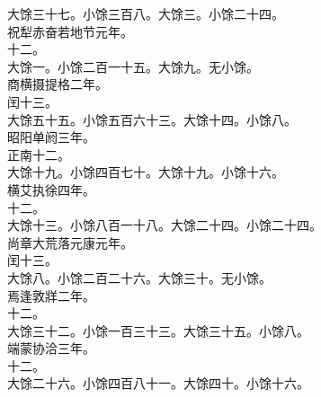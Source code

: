 \documentclass{zhvt-classic}
\begin{document}
\hspace*{2em}大馀三十七。小馀三百八。大馀三。小馀二十四。\\
\hspace*{2em}祝犁赤奋若地节元年。\\
\hspace*{2em}十二。\\
\hspace*{2em}大馀一。小馀二百一十五。大馀九。无小馀。\\
\hspace*{2em}商横摄提格二年。\\
\hspace*{2em}闰十三。\\
\hspace*{2em}大馀五十五。小馀五百六十三。大馀十四。小馀八。\\
\hspace*{2em}昭阳单阏三年。\\
\hspace*{2em}正南十二。\\
\hspace*{2em}大馀十九。小馀四百七十。大馀十九。小馀十六。\\
\hspace*{2em}横艾执徐四年。\\
\hspace*{2em}十二。\\
\hspace*{2em}大馀十三。小馀八百一十八。大馀二十四。小馀二十四。\\
\hspace*{2em}尚章大荒落元康元年。\\
\hspace*{2em}闰十三。\\
\hspace*{2em}大馀八。小馀二百二十六。大馀三十。无小馀。\\
\hspace*{2em}焉逢敦牂二年。\\
\hspace*{2em}十二。\\
\hspace*{2em}大馀三十二。小馀一百三十三。大馀三十五。小馀八。\\
\hspace*{2em}端蒙协洽三年。\\
\hspace*{2em}十二。\\
\hspace*{2em}大馀二十六。小馀四百八十一。大馀四十。小馀十六。\\
\end{document}
